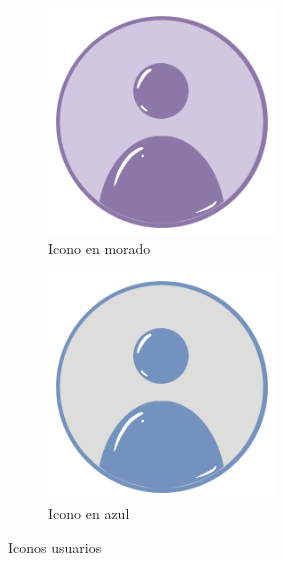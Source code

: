 \documentclass[a4paper, 12pt]{article}
\begin{document}
\begin{figure}[H]
   	\begin{subfigure}{0.48\textwidth}
		\begin{center}
			{\includegraphics[width=6cm]{ALLUSER.png}\par}
			\caption{Icono en morado}
		\end{center}  
	\end{subfigure}\hfill
   	\begin{subfigure}{0.48\textwidth}
		\begin{center}
			{\includegraphics[width=6cm]{USER.png}\par}
			\caption{Icono en azul}
		\end{center}  
	\end{subfigure}\hfill
	\caption{Iconos usuarios}
\end{figure}
\end{document}
